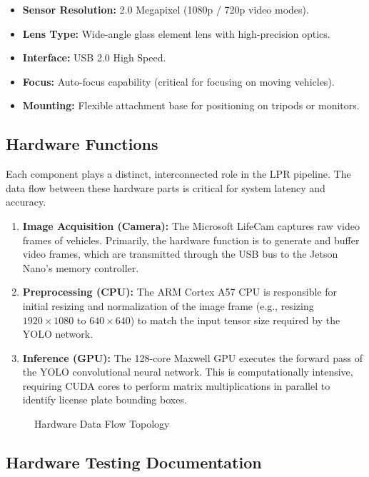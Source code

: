 \begin{itemize}
	\item \textbf{Sensor Resolution:} 2.0 Megapixel (1080p / 720p video modes).
	\item \textbf{Lens Type:} Wide-angle glass element lens with high-precision optics.
	\item \textbf{Interface:} USB 2.0 High Speed.
	\item \textbf{Focus:} Auto-focus capability (critical for focusing on moving vehicles).
	\item \textbf{Mounting:} Flexible attachment base for positioning on tripods or monitors.
\end{itemize}

\subsection{Hardware Functions}

Each component plays a distinct, interconnected role in the LPR pipeline. The data flow between these hardware parts is critical for system latency and accuracy.

\begin{enumerate}
	\item \textbf{Image Acquisition (Camera):} The Microsoft LifeCam captures raw video frames of vehicles. Primarily, the hardware function is to generate and buffer video frames, which are transmitted through the USB bus to the Jetson Nano's memory controller.
	\item \textbf{Preprocessing (CPU):} The ARM Cortex A57 CPU is responsible for initial resizing and normalization of the image frame (e.g., resizing $1920 \times 1080$ to $640 \times 640$) to match the input tensor size required by the YOLO network.
	\item \textbf{Inference (GPU):} The 128-core Maxwell GPU executes the forward pass of the YOLO convolutional neural network. This is computationally intensive, requiring CUDA cores to perform matrix multiplications in parallel to identify license plate bounding boxes.
\end{enumerate}

\begin{figure}[h]
	\centering
	
	\caption{Hardware Data Flow Topology}
	\label{fig:hw_topology}
\end{figure}

\subsection{Hardware Testing Documentation}

